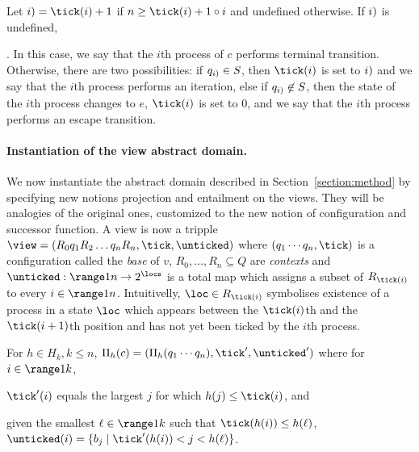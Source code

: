 
Let $\next(i) = \tick(i)+1$ if $n\geq \tick(i)+1\circ i$ and undefined
otherwise.  If $\next(i)$ is undefined, 



.  In this
case, we say that the $i$th process of $c$ performs terminal
transition.  Otherwise, there are two possibilities: if
$q_{\next(i)}\in S$, then $\tick(i)$ is set to $\next(i)$ and we say
that the $i$th process performs an iteration, else if
$q_{\next(i)}\not\in S$, then the state of the $i$th process changes
to $e$, $\tick(i)$ is set to $0$, and we say that the $i$th process
performs an escape transition.

%
\paragraph{Instantiation of the view abstract domain.}
We now instantiate the abstract domain described in Section~\ref{section:method} by specifying new notions projection and entailment on the views. They will be analogies of the original ones, customized to the new notion of configuration and successor function.
A view is now a tripple $\view = (R_0q_1R_2\ldots q_nR_{n},\tick,\unticked)$ where
$(q_1\cdots q_n,\tick)$ is a configuration called the \emph{base} of $v$, 
$R_0,\ldots,R_{n}\subseteq Q$ are \emph{contexts} and
$\unticked:\range 1 n\rightarrow 2^\locs$ is a total map which assigns 
a subset of $R_{\tick(i)}$ 
to every $i\in\range 1 n$. 
Intuitivelly, $\loc \in R_{\tick(i)}$ symbolises existence of a process in a state $\loc$ which 
appears between the ${\tick(i)}$th and the ${\tick(i+1)}$th position and has not yet been ticked by the $i$th process. 

%
For $h\in H_k, k\leq n$,
$\proj h c = (\proj h {q_1\cdots q_n},\tick',\unticked')$ where
for $i\in \range 1 k$, 
\begin{inparaenum}[(i)]
\item
$\tick'(i)$ equals the largest $j$ for which $h(j)\leq \tick(i)$, and
\item
given the smallest $\ell\in\range 1 k$ such that $\tick(h(i))\leq h(\ell)$,
$\unticked(i) = \{b_j\mid \tick'(h(i)) < j < h(\ell)\}$. 
\end{inparaenum}
%

